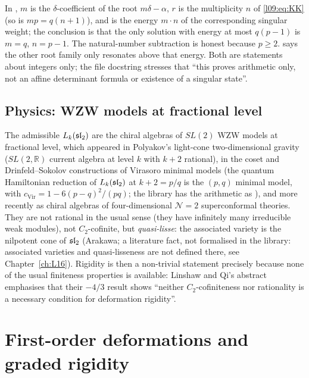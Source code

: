 \begin{dictionary}
In , $m$ is the $\delta$-coefficient of the root $m\delta-\alpha$,
$r$ is the multiplicity $n$ of \eqref{l09:eq:KK} (so  is $mp = q(n+1)$), and  is
the energy $m\cdot n$ of the corresponding singular weight; the conclusion is that the only
solution with energy at most $q(p-1)$ is $m = q$, $n = p-1$. The natural-number subtraction
 is honest because $p\ge2$.  says the other root family
only resonates above that energy. Both are statements about integers only; the file docstring
stresses that ``this proves arithmetic only, not an affine determinant formula or existence of a
singular state''.
\end{dictionary}

\subsection{Physics: WZW models at fractional level}

The admissible $L_k(\mathfrak{sl}_2)$ are the chiral algebras of $SL(2)$ WZW models at fractional level,
which appeared in Polyakov's light-cone two-dimensional gravity ($SL(2,\mathbb{R})$ current algebra
at level $k$ with $k+2$ rational), in the coset and Drinfeld--Sokolov constructions of Virasoro
minimal models (the quantum Hamiltonian reduction of $L_k(\mathfrak{sl}_2)$ at $k+2 = p/q$ is the $(p,q)$
minimal model, with $c_{\mathrm{Vir}} = 1 - 6(p-q)^2/(pq)$; the library has the arithmetic as
), and more recently as chiral algebras of
four-dimensional $\mathcal{N}=2$ superconformal theories. They are not rational in the usual sense
(they have infinitely many irreducible weak modules), not $C_2$-cofinite, but \emph{quasi-lisse}:
the associated variety is the nilpotent cone of $\mathfrak{sl}_2$ (Arakawa; a literature fact, not formalised in the
library: associated varieties and quasi-lisseness are not defined there, see Chapter~\ref{ch:L16}). Rigidity
is then a non-trivial statement precisely because none of the usual finiteness properties is
available: Linshaw and Qi's abstract emphasises that their $-4/3$ result shows ``neither
$C_2$-cofiniteness nor rationality is a necessary condition for deformation rigidity''.

\section{First-order deformations and graded rigidity}\label{l09:sec:deform}

